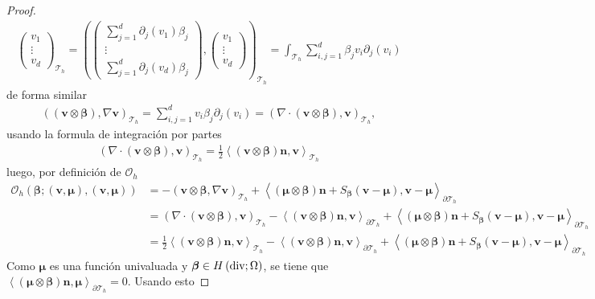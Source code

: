 \documentclass[10pt,a4paper]{report}
\newcommand{\bs}{\boldsymbol}
\newcommand{\Th}{\mathscr{T}_{h}}
\newcommand{\Hdiv}{H\left(\textup{div};\Omega\right)}
\providecommand{\PI}[2]{\left\langle #1,#2  \right\rangle}
\providecommand{\Pii}[2]{\left( #1,#2  \right)}
\begin{document}
\begin{proof}
\begin{align*}
{\begin{pmatrix}
        	v_{1}\\ 
        	\vdots\\ 
        	v_{d}
        \end{pmatrix}}_{\Th} =  \Pii{\begin{pmatrix}
        \sum_{j=1}^{d}\partial_{j}(v_{1})\beta_{j}\\ 
        \vdots\\ 
        \sum_{j=1}^{d}\partial_{j}(v_{d})\beta_{j}
    \end{pmatrix}}{\begin{pmatrix}
    v_{1}\\ 
    \vdots\\ 
    v_{d}
\end{pmatrix}}_{\Th} = \int_{\Th}\sum_{i,j=1}^{d}\beta_{j}v_{i}\partial_{j}(v_{i})
        \end{align*}
        de forma similar
        \begin{align*}
        	\Pii{(\bs{v}\otimes\bs{\beta})}{\nabla\bs{v}}_{\Th} = \sum_{i,j=1}^{d} v_{i}\beta_{j}\partial_{j}(v_{i}) = \Pii{\nabla\cdot(\bs{v}\otimes\bs{\beta})}{\bs{v}}_{\Th},
        \end{align*}
        usando la formula de integración por partes
        \begin{align*}
        	\Pii{\nabla\cdot(\bs{v}\otimes\bs{\beta})}{\bs{v}}_{\Th} = \frac{1}{2}\PI{(\bs{v}\otimes\bs{\beta})\bs{n}}{\bs{v}}_{\Th}
        \end{align*}
        luego, por definición de $\mathcal{O}_{h}$
        \begin{align*}
        	\mathcal{O}_{h}\left(\bs{\beta};(\bs{v},\bs{\mu}),(\bs{v},\bs{\mu})\right) &= -\Pii{\bs{v}\otimes\bs{\beta}}{\nabla\bs{v}}_{\Th} + \PI{(\bs{\mu}\otimes\bs{\beta})\bs{n}+S_{\bs{\beta}}(\bs{v}-\bs{\mu})}{\bs{v}-\bs{\mu}}_{\partial\Th}\\
        	&= \Pii{\nabla\cdot(\bs{v}\otimes\bs{\beta})}{\bs{v}}_{\Th} - \PI{(\bs{v}\otimes\bs{\beta})\bs{n}}{\bs{v}}_{\partial\Th} + \PI{(\bs{\mu}\otimes\bs{\beta})\bs{n}+S_{\bs{\beta}}(\bs{v}-\bs{\mu})}{\bs{v}-\bs{\mu}}_{\partial\Th}\\
        	&= \frac{1}{2}\PI{(\bs{v}\otimes\bs{\beta})\bs{n}}{\bs{v}}_{\Th} - \PI{(\bs{v}\otimes\bs{\beta})\bs{n}}{\bs{v}}_{\partial\Th} + \PI{(\bs{\mu}\otimes\bs{\beta})\bs{n}+S_{\bs{\beta}}(\bs{v}-\bs{\mu})}{\bs{v}-\bs{\mu}}_{\partial\Th}
        \end{align*}
        Como $\bs{\mu}$ es una función univaluada y $\bs{\beta}\in\Hdiv$, se tiene que $\PI{(\bs{\mu}\otimes\bs{\beta})\bs{n}}{\bs{\mu}}_{\partial\Th} = 0$. Usando esto

\end{proof}
\end{document}
